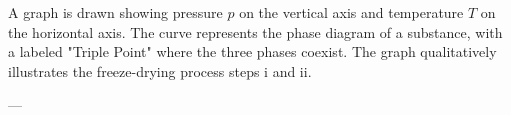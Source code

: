 A graph is drawn showing pressure \( p \) on the vertical axis and temperature \( T \) on the horizontal axis. The curve represents the phase diagram of a substance, with a labeled "Triple Point" where the three phases coexist. The graph qualitatively illustrates the freeze-drying process steps i and ii.

---